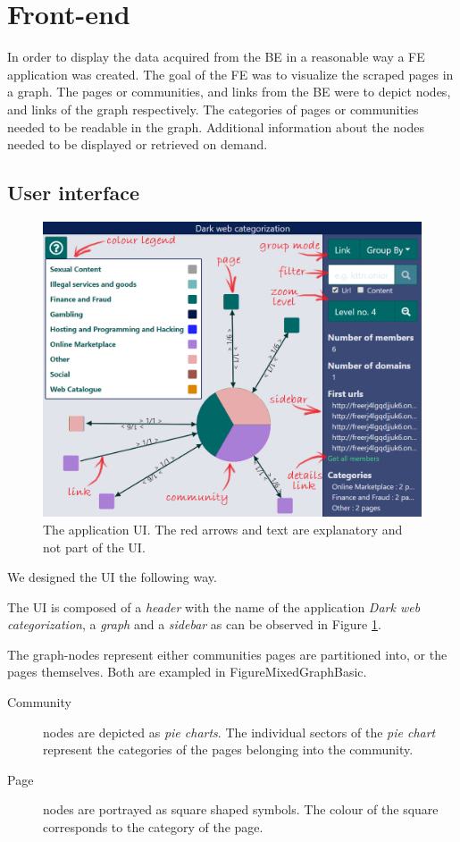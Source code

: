 \section{Front-end}
In order to display the data acquired from the BE in a reasonable way a FE application was created. The goal of the FE was to visualize the scraped pages in a graph. The pages or communities, and links from the BE were to depict nodes, and links of the graph respectively. The categories of pages or communities needed to be readable in the graph. Additional information about the nodes needed to be displayed or retrieved on demand.

\subsection{User interface}
\begin{figure}[ht]
  \centering
  \includegraphics[width=\textwidth]{Images/basic_view.png}
  \caption{The application UI. The red arrows and text are explanatory and not part of the UI.}
  \label{MixedGraphBasic}
\end{figure}  
We designed the UI the following way.

The UI is composed of a \textit{header} with the name of the application \textit{Dark web categorization}, a \textit{graph} and a \textit{sidebar} as can be observed in Figure \ref{MixedGraphBasic}. 

The graph-nodes represent either communities pages are partitioned into, or the pages themselves. Both are exampled in Figure{MixedGraphBasic}.
\begin{description}
    \item[Community]  nodes are depicted as \textit{pie charts}. The individual sectors of the \textit{pie chart} represent the categories of the pages belonging into the community. 
    \item[Page] nodes are portrayed as square shaped symbols. The colour of the square corresponds to the category of the page.
\end{description}  

